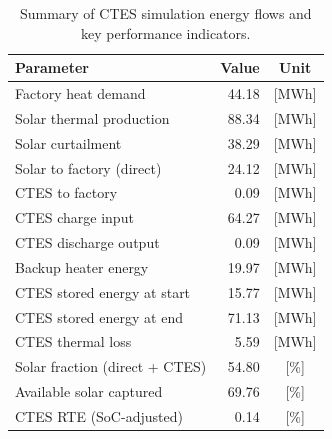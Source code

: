 \renewcommand{\arraystretch}{1.2}
\begin{table}[h]
\centering
\begin{tabular}{l|r c}
\hline
Parameter & Value & Unit \\
\hline
Factory heat demand & 44.18 & [MWh] \\
Solar thermal production & 88.34 & [MWh] \\
Solar curtailment & 38.29 & [MWh] \\
Solar to factory (direct) & 24.12 & [MWh] \\
CTES to factory & 0.09 & [MWh] \\
CTES charge input & 64.27 & [MWh] \\
CTES discharge output & 0.09 & [MWh] \\
Backup heater energy & 19.97 & [MWh] \\
CTES stored energy at start & 15.77 & [MWh] \\
CTES stored energy at end & 71.13 & [MWh] \\
CTES thermal loss & 5.59 & [MWh] \\
\hline
Solar fraction (direct + CTES) & 54.80 & [\%] \\
Available solar captured & 69.76 & [\%] \\
CTES RTE (SoC-adjusted) & 0.14 & [\%] \\
\hline
\end{tabular}
\caption{Summary of CTES simulation energy flows and key performance indicators.}
\label{tab:ctes-simulation-summary}
\end{table}
